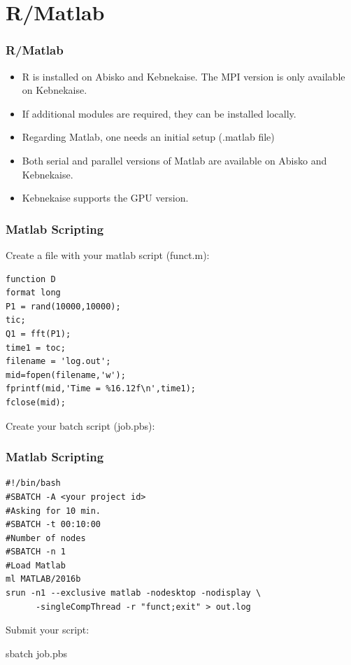 %

\section{R/Matlab}

\begin{frame}[fragile]
	\frametitle{R/Matlab}
\begin{itemize}
\item R is installed on Abisko and Kebnekaise. The MPI version
is only available on Kebnekaise. 

\item If additional modules are required, they can be installed 
locally. 

\item Regarding Matlab, one needs an initial setup (.matlab file)

\item Both serial and parallel versions of Matlab are available
on Abisko and Kebnekaise.

\item Kebnekaise supports the GPU version.
\end{itemize}

\end{frame}

\begin{frame}[fragile]
	\frametitle{Matlab Scripting}
Create a file with your matlab script (funct.m):

{\small 
        \begin{verbatim}             
function D 
format long
P1 = rand(10000,10000);
tic;
Q1 = fft(P1);
time1 = toc;
filename = 'log.out';
mid=fopen(filename,'w');
fprintf(mid,'Time = %16.12f\n',time1);
fclose(mid);
        \end{verbatim}
}

Create your batch script (job.pbs):

\end{frame}

\begin{frame}[fragile]
	\frametitle{Matlab Scripting}

{\small 
        \begin{verbatim}             
#!/bin/bash
#SBATCH -A <your project id>
#Asking for 10 min.
#SBATCH -t 00:10:00
#Number of nodes
#SBATCH -n 1
#Load Matlab
ml MATLAB/2016b
srun -n1 --exclusive matlab -nodesktop -nodisplay \
      -singleCompThread -r "funct;exit" > out.log
        \end{verbatim}
}

Submit your script:

sbatch job.pbs

\end{frame}



